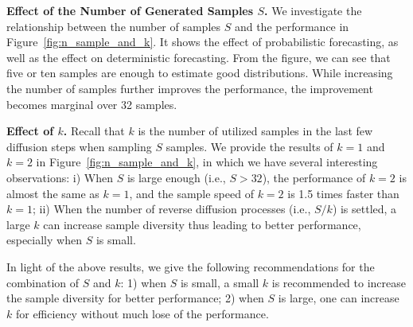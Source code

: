 {\begin{table}[h]
    \caption{Influence of the kernel size $K$ in TCN on AIR-GZ ($T_h=12, T_p=12, N = 100, \beta_N = 0.1$).}\vspace{-.5em}
    \centering
    \scriptsize
    \setlength\tabcolsep{4pt}
	\label{tab:tcn_influence}
  \vspace{-.5em}
\end{table}

\textbf{Effect of the Number of Generated Samples $S$.} We investigate the relationship between the number of samples $S$ and the performance in Figure~\ref{fig:n_sample_and_k}. It shows the effect of probabilistic forecasting, as well as the effect on deterministic forecasting. From the figure, we can see that five or ten samples are enough to estimate good distributions. While increasing the number of samples further improves the performance, the improvement becomes marginal over 32 samples.

\textbf{Effect of $k$.} Recall that $k$ is the number of utilized samples in the last few diffusion steps when sampling $S$ samples. We provide the results of $k=1$ and $k=2$ in Figure~\ref{fig:n_sample_and_k}, in which we have several interesting observations: i) When $S$ is large enough (i.e., $S>32$), the performance of $k=2$ is almost the same as $k=1$, and the sample speed of $k=2$ is 1.5 times faster than $k=1$; ii) When the number of reverse diffusion processes (i.e., $S/k$) is settled, a large $k$ can increase sample diversity thus leading to better performance, especially when $S$ is small.

\par In light of the above results, we give the following recommendations for the combination of $S$ and $k$: 1) when $S$ is small, a small $k$ is recommended to increase the sample diversity for better performance; 2) when $S$ is large, one can increase $k$ for efficiency without much lose of the performance.

}
